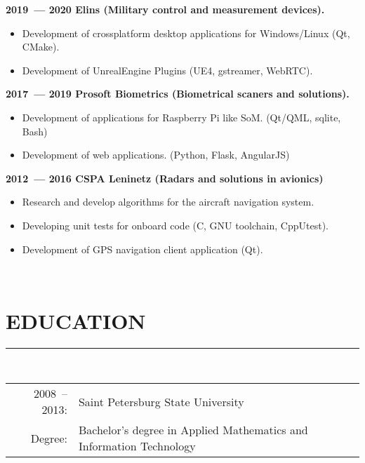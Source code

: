 \documentclass[a4paper,oneside,12pt]{article}
\newcommand{\cvpart}[1]{%
\vspace{-1em}%
\section*{\large\bfseries\MakeTextUppercase{#1}}%
\vspace{-1em}%
\rule{\linewidth}{0.3em}\\[-.3em]%
}
\begin{document}
{\bf
2019~--- 2020 Elins (Military control and measurement devices).
}
\begin{itemize}
    \item Development of crossplatform desktop applications for Windows/Linux (Qt, CMake).
    \item Development of UnrealEngine Plugins (UE4, gstreamer, WebRTC).
\end{itemize}

{\bf
2017~--- 2019 Prosoft Biometrics (Biometrical scaners and solutions).
}
\begin{itemize}
    \item Development of applications for Raspberry Pi like SoM. (Qt/QML, sqlite, Bash)
    \item Development of web applications. (Python, Flask, AngularJS)
\end{itemize}

{\bf
2012~--- 2016 CSPA Leninetz (Radars and solutions in avionics)
}

\begin{itemize}
    \item Research and develop algorithms for the aircraft navigation system.
    \item Developing unit tests for onboard code (C, GNU toolchain, CppUtest).
    \item Development of GPS navigation client application (Qt). 
\end{itemize}


~\\

\cvpart{Education}

\begin{tabularx}{\textwidth}{rX}
  2008~-- 2013:& Saint Petersburg State University\\
        Degree:& Bachelor's degree in Applied Mathematics and Information Technology\\  
\end{tabularx}
\end{document}

